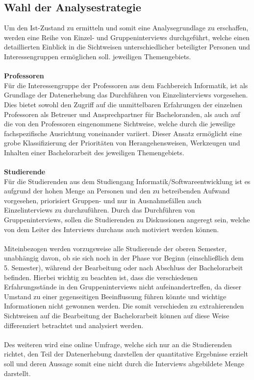 \documentclass{scrreprt}
\begin{document}
\subsection{Wahl der Analysestrategie}
Um den Ist-Zustand zu ermitteln und somit eine Analysegrundlage zu erschaffen, werden eine Reihe von Einzel- und Gruppeninterviews durchgeführt, welche einen detaillierten Einblick in die Sichtweisen unterschiedlicher beteiligter Personen und Interessengruppen ermöglichen soll.
jeweiligen Themengebiets.\\\\
\textbf{Professoren}\\
Für die Interessengruppe der Professoren aus dem Fachbereich Informatik, ist als Grundlage der Datenerhebung das Durchführen von Einzelinterviews vorgesehen. Dies bietet sowohl den Zugriff auf die unmittelbaren Erfahrungen der einzelnen Professoren als Betreuer und Ansprechpartner für Bacheloranden, als auch auf die von den Professoren eingenommene Sichtweise, welche durch die jeweilige fachspezifische Ausrichtung voneinander variiert. Dieser Ansatz ermöglicht eine grobe Klassifizierung der Prioritäten von Herangehensweisen, Werkzeugen und Inhalten einer Bachelorarbeit des jeweiligen Themengebiets.\\\\
\textbf{Studierende}\\
Für die Studierenden aus dem Studiengang Informatik/Softwareentwicklung ist es aufgrund der hohen Menge an Personen und den zu betreibenden Aufwand vorgesehen, priorisiert Gruppen- und nur in Ausnahmefällen auch Einzelinterviews zu durchzuführen. 
Durch das Durchführen von Gruppeninterviews, sollen die Studierenden zu Diskussionen angeregt sein, welche von dem Leiter des Interviews durchaus auch motiviert werden können.\\\\
Miteinbezogen werden vorzugsweise alle Studierende der oberen Semester, unabhängig davon, ob sie sich noch in der Phase vor Beginn (einschließlich dem 5. Semester), während der Bearbeitung oder nach Abschluss der Bachelorarbeit befinden. Hierbei wichtig zu beachten ist, dass die verschiedenen Erfahrungsstände in den Gruppeninterviews nicht aufeinandertreffen, da dieser Umstand zu einer gegenseitigen Beeinflussung führen könnte und wichtige Informationen nicht gewonnen werden. Die somit verschieden zu extrahierenden Sichtweisen auf die Bearbeitung der Bachelorarbeit können auf diese Weise differenziert betrachtet und analysiert werden.\\\\
Des weiteren wird eine online Umfrage, welche sich nur an die Studierenden richtet, den Teil der Datenerhebung darstellen der quantitative Ergebnisse erzielt soll und deren Aussage somit eine nicht durch die Interviews abgebildete Menge darstellt.
\end{document}
